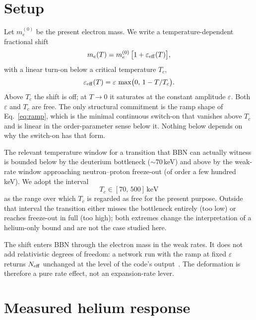 \documentclass[aps,prd,twocolumn,superscriptaddress,nofootinbib,10pt]{revtex4-2}
\begin{document}
\section{Setup}\label{sec:setup}

Let $m_e^{(0)}$ be the present electron mass. We write a temperature-dependent fractional shift
%
\begin{equation}
  m_e(T) = m_e^{(0)}\,\bigl[1 + \varepsilon_{\rm eff}(T)\bigr],
  \label{eq:me}
\end{equation}
%
with a linear turn-on below a critical temperature $T_c$,
%
\begin{equation}
  \varepsilon_{\rm eff}(T)
  = \varepsilon \,\max\bigl(0,\, 1 - T/T_c\bigr).
  \label{eq:ramp}
\end{equation}
%
Above $T_c$ the shift is off; at $T\to 0$ it saturates at the constant amplitude $\varepsilon$.
Both $\varepsilon$ and $T_c$ are free. The only structural commitment is the ramp shape of
Eq.~\eqref{eq:ramp}, which is the minimal continuous switch-on that vanishes above $T_c$ and is
linear in the order-parameter sense below it. Nothing below depends on why the switch-on has that
form.

The relevant temperature window for a transition that BBN can actually witness is bounded below
by the deuterium bottleneck ($\sim\!70\,$keV) and above by the weak-rate window approaching
neutron--proton freeze-out (of order a few hundred keV). We adopt the interval
%
\begin{equation}
  T_c \in [70,\,500]\,\mathrm{keV}
  \label{eq:window}
\end{equation}
%
as the range over which $T_c$ is regarded as free for the present purpose. Outside that interval
the transition either misses the bottleneck entirely (too low) or reaches freeze-out in full (too
high); both extremes change the interpretation of a helium-only bound and are not the case
studied here.

The shift enters BBN through the electron mass in the weak rates. It does not add relativistic
degrees of freedom: a network run with the ramp at fixed $\varepsilon$ returns $N_{\rm eff}$
unchanged at the level of the code's output~\cite{PRyMordial2023}. The deformation is therefore a
pure rate effect, not an expansion-rate lever.

\section{Measured helium response}\label{sec:helium}
\end{document}

